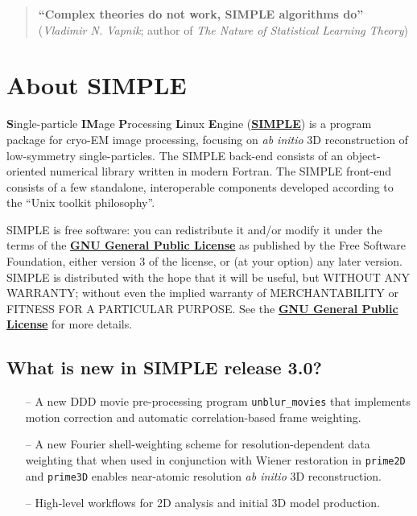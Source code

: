 \documentclass[a4paper,11pt]{article}
\newcommand{\prgname}[1]{\textcolor{NavyBlue}{\texttt{#1}}}
\begin{document}
\begin{quote}
\textbf{``Complex theories do not work, SIMPLE algorithms do''}\\(\textit{Vladimir N. Vapnik}; author of \textit{The Nature of Statistical Learning Theory})
\end{quote}
\clearpage

\tableofcontents{}
\clearpage

\section{About SIMPLE}

\textbf{S}ingle-particle \textbf{IM}age \textbf{P}rocessing \textbf{L}inux \textbf{E}ngine (\href{www.simplecryoem.com}{\textbf{\textcolor{BurntOrange}{SIMPLE}}}) is a program package for cryo-EM image processing, focusing on \textit{ab initio} 3D reconstruction of low-symmetry single-particles. The SIMPLE back-end consists of an object-oriented numerical library written in modern Fortran. The SIMPLE front-end consists of a few standalone, interoperable components developed according to the ``Unix toolkit philosophy''.

SIMPLE is free software: you can redistribute it and/or modify it under the terms of the \href{http://www.gnu.org/copyleft/gpl.html}{\textbf{\textcolor{BurntOrange}{GNU General Public License}}} as published by the Free Software Foundation, either version 3 of the license, or (at your option) any later version. SIMPLE is distributed with the hope that it will be useful, but WITHOUT ANY WARRANTY; without even the implied warranty of MERCHANTABILITY or FITNESS FOR A PARTICULAR PURPOSE. See the \href{http://www.gnu.org/copyleft/gpl.html}{\textbf{\textcolor{BurntOrange}{GNU General Public License}}} for more details.

\subsection{What is new in SIMPLE release 3.0?}
\begin{itemize}
    \item[--] A new DDD movie pre-processing program \prgname{unblur\_movies} that implements motion correction and automatic correlation-based frame weighting. 
    \item[--] A new Fourier shell-weighting scheme for resolution-dependent data weighting that when used in conjunction with Wiener restoration in \prgname{prime2D} and \prgname{prime3D} enables near-atomic resolution \textit{ab initio} 3D reconstruction.
    \item[--] High-level workflows for 2D analysis and initial 3D model production.
\end{itemize}
\end{document}
